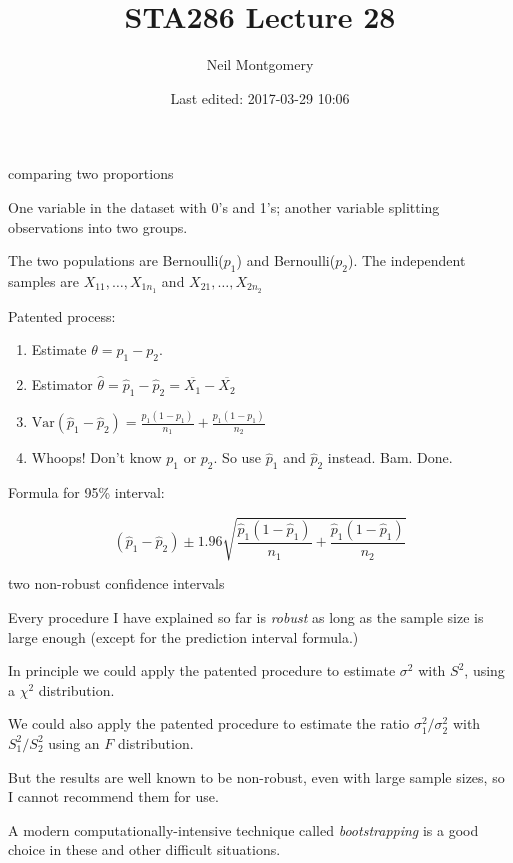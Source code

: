 \documentclass[ignorenonframetext,aspectratio=169]{beamer}
\title{STA286 Lecture 28}
\author{Neil Montgomery}
\date{Last edited: 2017-03-29 10:06}
\newcommand\V[1]{\text{Var}\!\left(#1\right)}
\newcommand\ol{\overline}
\begin{document}
\frame{\titlepage}

\begin{frame}{comparing two proportions}

One variable in the dataset with 0's and 1's; another variable splitting
observations into two groups.

The two populations are Bernoulli(\(p_1\)) and Bernoulli(\(p_2\)). The
independent samples are \(X_{11},\ldots,X_{1n_1}\) and
\(X_{21},\ldots,X_{2n_2}\)

Patented process:

\begin{enumerate}[<+->]
\def\labelenumi{\arabic{enumi}.}
\item
  Estimate \(\theta = p_1 - p_2\).
\item
  Estimator \(\hat\theta = \hat p_1 - \hat p_2 = \ol{X_1} - \ol{X_2}\)
\item
  \(\V{\hat p_1 - \hat p_2} = \frac{p_1(1-p_1)}{n_1} + \frac{p_1(1-p_1)}{n_2}\)
\item
  Whoops! Don't know \(p_1\) or \(p_2\). So use \(\hat p_1\) and
  \(\hat p_2\) instead. Bam. Done.
\end{enumerate}

\pause Formula for 95\% interval:

\[(\hat p_1 - \hat p_2) \pm 1.96\sqrt{\frac{\hat p_1(1-\hat p_1)}{n_1} + \frac{\hat p_1(1- \hat p_1)}{n_2}}\]

\end{frame}

\begin{frame}{two non-robust confidence intervals}

Every procedure I have explained so far is \textit{robust} as long as
the sample size is large enough (except for the prediction interval
formula.)

In principle we could apply the patented procedure to estimate
\(\sigma^2\) with \(S^2\), using a \(\chi^2\) distribution.

We could also apply the patented procedure to estimate the ratio
\(\sigma_1^2/\sigma_2^2\) with \(S_1^2/S_2^2\) using an \(F\)
distribution.

But the results are well known to be non-robust, even with large sample
sizes, so I cannot recommend them for use.

\pause A modern computationally-intensive technique called
\textit{bootstrapping} is a good choice in these and other difficult
situations.

\end{frame}
\end{document}
